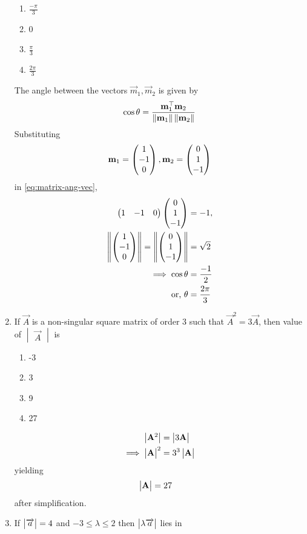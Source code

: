 \documentclass[journal,12pt,twocolumn]{IEEEtran}
\renewcommand\thesection{\arabic{section}}
\begin{document}
\begin{enumerate}[label=\thesection.\arabic*.,ref=\thesection.\theenumi]
\begin{enumerate}
    \item $\frac{-\pi}{3}$
    \item 0
    \item $\frac{\pi}{3}$
    \item $\frac{2\pi}{3}$
\end{enumerate}
\solution 
The angle between the vectors $\vec{m}_1, \vec{m}_2$ is given by 
  \begin{align}
	  \label{eq:matrix-ang-vec}
	  \cos \theta = \frac{\mathbf{m}_1^{\top} \mathbf{m}_2}{\left\lVert\mathbf{m}_1\right\rVert\left\lVert \mathbf{m}_2\right\rVert}
  \end{align}
  Substituting 
  \begin{align}
\mathbf{m}_1 = \begin{pmatrix}1 \\ -1 \\ 0\end{pmatrix}, \mathbf{m}_2 = \begin{pmatrix}0 \\ 1 \\ -1\end{pmatrix}
  \end{align}
	  in \eqref{eq:matrix-ang-vec},
%
  \begin{align}
	  \begin{pmatrix}1 & -1 & 0\end{pmatrix} \begin{pmatrix}0 \\ 1 \\ -1\end{pmatrix} &= -1,
	  \\
	  \left\lVert\begin{pmatrix}1 \\ -1 \\ 0\end{pmatrix}\right\rVert=\left\lVert\begin{pmatrix}0 \\ 1 \\ -1\end{pmatrix}\right\rVert &= \sqrt{2}
	  \\
	  \implies \cos \theta &= \frac{-1}{2}
	  \\
	  \text{or, }\theta &= \frac{2\pi}{3}
  \end{align}

\item  If $\vec{A}$ is a non-singular square matrix of order 3 such that $ \vec{A}^2 =3\vec{A} $, then value of  $\begin{vmatrix}\vec{A} \end{vmatrix}$ is

\begin{enumerate}
    \item -3
     \item 3
     \item 9
     \item 27
\end{enumerate}
  \begin{align}
	  \begin{vmatrix}\mathbf{A}^2\end{vmatrix} &=\begin{vmatrix}3\mathbf{ A}\end{vmatrix}
	  \\
	  \implies 
	  \begin{vmatrix}\mathbf{A}\end{vmatrix} ^2&=3^3\begin{vmatrix}\mathbf{ A}\end{vmatrix}
  \end{align}
	yielding 
  \begin{align}
	  \begin{vmatrix}\mathbf{A}\end{vmatrix} &=27
  \end{align}
  after simplification.
\item  If $\begin{vmatrix}\overrightarrow{a}\end{vmatrix} = 4 $ and  $ -3\leq \lambda \leq 2 $ then $\begin{vmatrix}\lambda \overrightarrow{a}\end{vmatrix} $ lies in


\end{enumerate}
\end{document}
